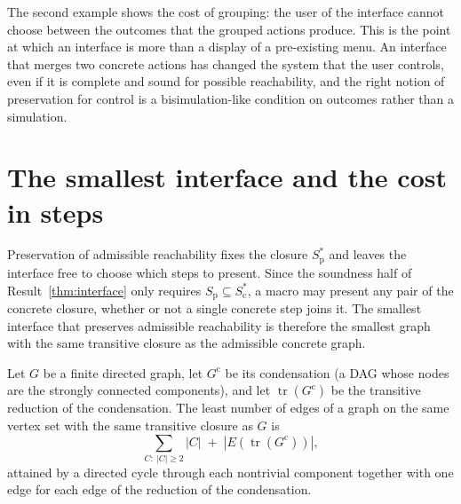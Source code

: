 The second example shows the cost of grouping: the user of the interface cannot choose between the outcomes that the grouped actions produce. This is the point at which an interface is more than a display of a pre-existing menu. An interface that merges two concrete actions has changed the system that the user controls, even if it is complete and sound for possible reachability, and the right notion of preservation for control is a bisimulation-like condition on outcomes rather than a simulation.


\section{The smallest interface and the cost in steps}\label{sec:min-interface}

Preservation of admissible reachability fixes the closure $S_{\mathrm p}^{*}$ and leaves the interface free to choose which steps to present. Since the soundness half of Result~\ref{thm:interface} only requires $S_{\mathrm p}\subseteq S_{\mathrm c}^{*}$, a macro may present any pair of the concrete closure, whether or not a single concrete step joins it. The smallest interface that preserves admissible reachability is therefore the smallest graph with the same transitive closure as the admissible concrete graph.

\begin{established}\label{thm:aho}
Let $G$ be a finite directed graph, let $G^{\mathrm c}$ be its condensation (a DAG whose nodes are the strongly connected components), and let $\operatorname{tr}(G^{\mathrm c})$ be the transitive reduction of the condensation. The least number of edges of a graph on the same vertex set with the same transitive closure as $G$ is
\[
\sum_{C:\ |C|\ge2}|C|\;+\;|E(\operatorname{tr}(G^{\mathrm c}))|,
\]
attained by a directed cycle through each nontrivial component together with one edge for each edge of the reduction of the condensation.
\end{established}

